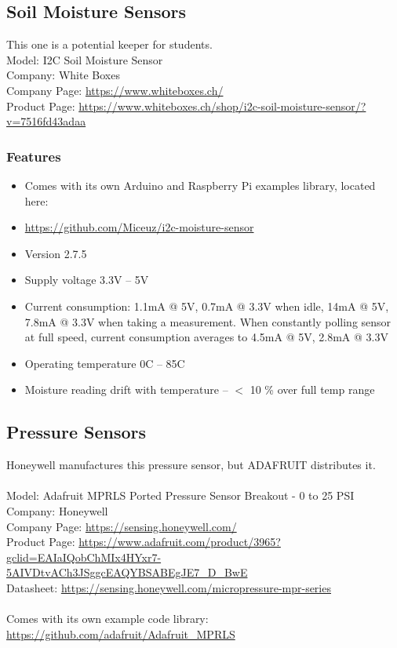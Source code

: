 \subsection{Soil Moisture Sensors}
This one is a potential keeper for students. \\
Model: I2C Soil Moisture Sensor \\
Company: White Boxes \\
Company Page: \href{https://www.whiteboxes.ch/}{https://www.whiteboxes.ch/} \\
Product Page: \href{https://www.whiteboxes.ch/shop/i2c-soil-moisture-sensor/?v=7516fd43adaa}{https://www.whiteboxes.ch/shop/i2c-soil-moisture-sensor/?v=7516fd43adaa} \\

\subsubsection{Features}
\begin{itemize}
	\item Comes with its own Arduino and Raspberry Pi examples library, located here: 
	\item \href{https://github.com/Miceuz/i2c-moisture-sensor}{https://github.com/Miceuz/i2c-moisture-sensor}
	\item Version 2.7.5
	\item Supply voltage 3.3V – 5V
	\item Current consumption: 1.1mA @ 5V, 0.7mA @ 3.3V when idle, 14mA @ 5V, 7.8mA @ 3.3V when taking a measurement. When constantly polling sensor at full speed, current consumption averages to 4.5mA @ 5V, 2.8mA @ 3.3V
	\item Operating temperature 0\degree C – 85\degree C
	\item Moisture reading drift with temperature – $<$ 10 \% over full temp range
\end{itemize}
\subsection{Pressure Sensors}

Honeywell manufactures this pressure sensor, but ADAFRUIT distributes it. \\
 \\
Model: Adafruit MPRLS Ported Pressure Sensor Breakout - 0 to 25 PSI \\
Company: Honeywell \\
Company Page: \href{https://sensing.honeywell.com/}{https://sensing.honeywell.com/} \\
Product Page: \href{https://www.adafruit.com/product/3965?gclid=EAIaIQobChMIx4HYxr7-5AIVDtvACh3JSggcEAQYBSABEgJE7_D_BwE}{https://www.adafruit.com/product/3965?gclid=EAIaIQobChMIx4HYxr7-5AIVDtvACh3JSggcEAQYBSABEgJE7\_D\_BwE} \\
Datasheet: \href{https://sensing.honeywell.com/micropressure-mpr-series}{https://sensing.honeywell.com/micropressure-mpr-series} \\
 \\
Comes with its own example code library: \href{https://github.com/adafruit/Adafruit_MPRLS}{https://github.com/adafruit/Adafruit\_MPRLS} \\

